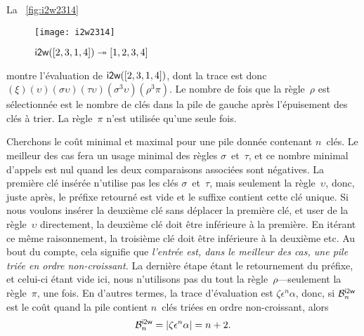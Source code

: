 La \fig~\vref{fig:i2w2314}
\begin{figure}
\centering
\texttt{[image: i2w2314]}
\caption{\(\fun{i2w}([2,3,1,4]) \twoheadrightarrow [1,2,3,4]\)}
\label{fig:i2w2314}
\end{figure}
montre l'évaluation  de
\(\fun{i2w}([2,3,1,4])\), dont la trace est donc
\((\xi)(\upsilon)(\sigma\upsilon)
(\tau\upsilon)(\sigma^3\upsilon)(\rho^3\pi)\). Le nombre de fois que
la règle~\(\rho\) est sélectionnée est le nombre de clés dans la pile
de gauche après l'épuisement des clés à trier. La règle~\(\pi\) n'est
utilisée qu'une seule fois.


Cherchons le coût minimal et maximal pour une pile donnée contenant
\(n\)~clés. Le meilleur des cas fera un usage minimal des règles
\(\sigma\)~et~\(\tau\), et ce nombre minimal d'appels est nul quand
les deux comparaisons associées sont négatives. La première clé
insérée n'utilise pas les clés \(\sigma\)~et~\(\tau\), mais seulement
la règle~\(\upsilon\), donc, juste après, le préfixe retourné est vide
et le suffixe contient cette clé unique. Si nous voulons insérer la
deuxième clé sans déplacer la première clé, et user de la
règle~\(\upsilon\) directement, la deuxième clé doit être inférieure à
la première. En itérant ce même raisonnement, la troisième clé doit
être inférieure à la deuxième etc. Au bout du compte, cela signifie
que \emph{l'entrée est, dans le meilleur des cas, une pile triée en
  ordre non-croissant.} La dernière étape étant le retournement du
préfixe, et celui-ci étant vide ici, nous n'utilisons pas du tout la
règle~\(\rho\)---seulement la règle~\(\pi\), une fois. En d'autres
termes, la trace d'évaluation est \(\zeta\epsilon^n\alpha\), donc, si
\(\B{\fun{i2w}}{n}\) est le coût quand la pile contient \(n\)~clés
triées en ordre non-croissant, alors
\begin{equation*}
\B{\fun{i2w}}{n} = \len{\zeta\epsilon^n\alpha} = n + 2.
\end{equation*}

